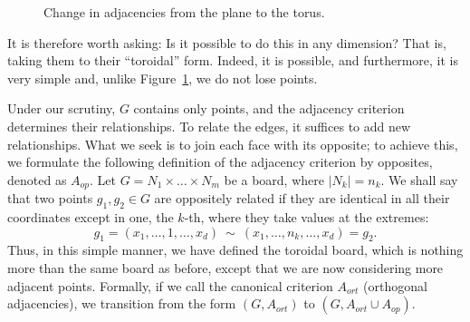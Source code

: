 \begin{figure}[H]
\begin{center}
	\end{center}
	\caption{Change in adjacencies from the plane to the torus.}
	\label{fig:Fig 27} %
\end{figure}
It is therefore worth asking: Is it possible to do this in any dimension? That is, taking them to their ``toroidal'' form. Indeed, it is possible, and furthermore, it is very simple and, unlike Figure~\ref{fig:Fig 27}, we do not lose points.

Under our scrutiny, \(G\) contains only points, and the adjacency criterion determines their relationships. To relate the edges, it suffices to add new relationships. What we seek is to join each face with its opposite; to achieve this, we formulate the following definition of the adjacency criterion by opposites, denoted as \(A_{op}\). Let \(G = N_1 \times \dots \times N_m\) be a board, where \(|N_k| = n_k\). We shall say that two points \(g_1, g_2 \in G\) are oppositely related if they are identical in all their coordinates except in one, the \(k\)-th, where they take values at the extremes:
\begin{equation*}
	g_1=(x_1,\dots, 1, \dots, x_d) \ \sim \ (x_1, \dots, n_k, \dots, x_d)=g_2.
\end{equation*}
Thus, in this simple manner, we have defined the toroidal board, which is nothing more than the same board as before, except that we are now considering more adjacent points. Formally, if we call the canonical criterion \(A_{ort}\) (orthogonal adjacencies), we transition from the form \((G,A_{ort})\) to \((G,A_{ort} \cup A_{op})\).

